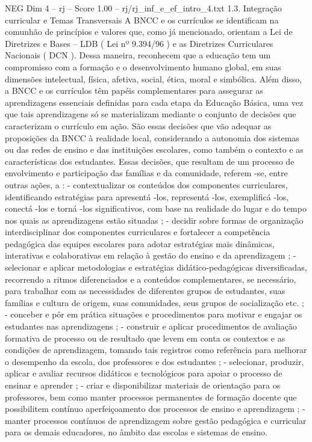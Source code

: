 \begin{textsample}{NEG Dim 4 – rj – Score 1.00 – rj/rj\_inf\_e\_ef\_intro\_4.txt}  \label{ex:f4_neg_130}
1.3.
Integração curricular e Temas Transversais A BNCC e os currículos se identificam na comunhão de princípios e valores que, como já mencionado, orientam a Lei de Diretrizes e Bases – LDB ( Lei nº 9.394/96 ) e as Diretrizes Curriculares Nacionais ( DCN ).
Dessa maneira, reconhecem que a educação tem um compromisso com a formação e o desenvolvimento humano global, em suas dimensões intelectual, física, afetiva, social, ética, moral e simbólica.
Além disso, a BNCC e os currículos têm papéis complementares para assegurar as aprendizagens essenciais definidas para cada etapa da Educação Básica, uma vez que tais aprendizagens só se materializam mediante o conjunto de decisões que caracterizam o currículo em ação.
São essas decisões que vão adequar as proposições da BNCC à realidade local, considerando a autonomia dos sistemas ou das redes de ensino e das instituições escolares, como também o contexto e as características dos estudantes.
Essas decisões, que resultam de um processo de envolvimento e participação das famílias e da comunidade, referem -se, entre outras ações, a : - contextualizar os conteúdos dos componentes curriculares, identificando estratégias para apresentá -los, representá -los, exemplificá -los, conectá -los e torná -los significativos, com base na realidade do lugar e do tempo nos quais as aprendizagens estão situadas ; - decidir sobre formas de organização interdisciplinar dos componentes curriculares e fortalecer a competência pedagógica das equipes escolares para adotar estratégias mais dinâmicas, interativas e colaborativas em relação à gestão do ensino e da aprendizagem ; - selecionar e aplicar metodologias e estratégias didático-pedagógicas diversificadas, recorrendo a ritmos diferenciados e a conteúdos complementares, se necessário, para trabalhar com as necessidades de diferentes grupos de estudantes, suas famílias e cultura de origem, suas comunidades, seus grupos de socialização etc. ; - conceber e pôr em prática situações e procedimentos para motivar e engajar os estudantes nas aprendizagens ; - construir e aplicar procedimentos de avaliação formativa de processo ou de resultado que levem em conta os contextos e as condições de aprendizagem, tomando tais registros como referência para melhorar o desempenho da escola, dos professores e dos estudantes ; - selecionar, produzir, aplicar e avaliar recursos didáticos e tecnológicos para apoiar o processo de ensinar e aprender ; - criar e disponibilizar materiais de orientação para os professores, bem como manter processos permanentes de formação docente que possibilitem contínuo aperfeiçoamento dos processos de ensino e aprendizagem ; - manter processos contínuos de aprendizagem sobre gestão pedagógica e curricular para os demais educadores, no âmbito das escolas e sistemas de ensino.

\end{textsample}

